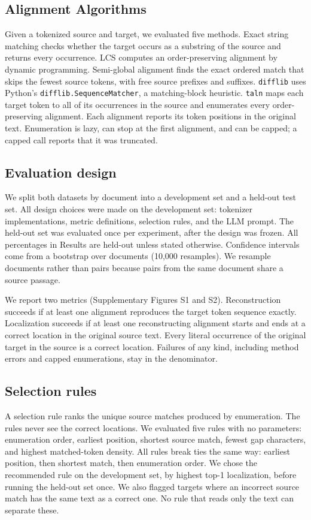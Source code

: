 \documentclass[pdflatex,lineno,referee,sn-vancouver-num]{sn-jnl}
\theoremstyle{thmstyleone}
\theoremstyle{thmstylethree}
\theoremstyle{thmstyletwo}
\begin{document}
\subsection{Alignment Algorithms}
Given a tokenized source and target, we evaluated five methods. Exact string matching checks whether the target occurs as a substring of the source and returns every occurrence. LCS computes an order-preserving alignment by dynamic programming. Semi-global alignment finds the exact ordered match that skips the fewest source tokens, with free source prefixes and suffixes. \texttt{difflib} uses Python's \texttt{difflib.SequenceMatcher}, a matching-block heuristic. \texttt{taln} maps each target token to all of its occurrences in the source and enumerates every order-preserving alignment. Each alignment reports its token positions in the original text. Enumeration is lazy, can stop at the first alignment, and can be capped; a capped call reports that it was truncated.

\subsection{Evaluation design}
We split both datasets by document into a development set and a held-out test set. All design choices were made on the development set: tokenizer implementations, metric definitions, selection rules, and the LLM prompt. The held-out set was evaluated once per experiment, after the design was frozen. All percentages in Results are held-out unless stated otherwise. Confidence intervals come from a bootstrap over documents (10,000 resamples). We resample documents rather than pairs because pairs from the same document share a source passage.

We report two metrics (Supplementary Figures S1 and S2). Reconstruction succeeds if at least one alignment reproduces the target token sequence exactly. Localization succeeds if at least one reconstructing alignment starts and ends at a correct location in the original source text. Every literal occurrence of the original target in the source is a correct location. Failures of any kind, including method errors and capped enumerations, stay in the denominator.

\subsection{Selection rules}
A selection rule ranks the unique source matches produced by enumeration. The rules never see the correct locations. We evaluated five rules with no parameters: enumeration order, earliest position, shortest source match, fewest gap characters, and highest matched-token density. All rules break ties the same way: earliest position, then shortest match, then enumeration order. We chose the recommended rule on the development set, by highest top-1 localization, before running the held-out set once. We also flagged targets where an incorrect source match has the same text as a correct one. No rule that reads only the text can separate these.
\end{document}
